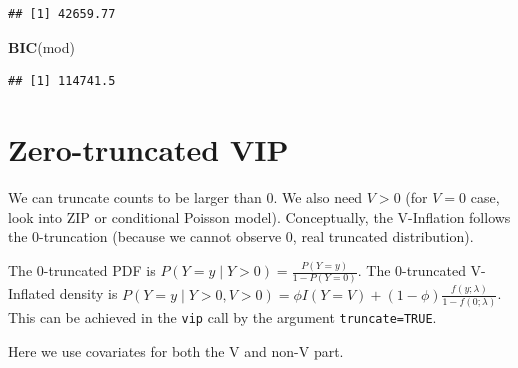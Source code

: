 \documentclass[]{article}
\newenvironment{Shaded}{\begin{snugshade}}{\end{snugshade}}
\newcommand{\KeywordTok}[1]{\textcolor[rgb]{0.13,0.29,0.53}{\textbf{#1}}}
\newcommand{\NormalTok}[1]{#1}
\begin{document}
\begin{verbatim}
## [1] 42659.77
\end{verbatim}

\begin{Shaded}
\begin{Highlighting}[]
\KeywordTok{BIC}\NormalTok{(mod)}
\end{Highlighting}
\end{Shaded}

\begin{verbatim}
## [1] 114741.5
\end{verbatim}

\section{Zero-truncated VIP}\label{zero-truncated-vip}

We can truncate counts to be larger than 0. We also need \(V>0\) (for
\(V=0\) case, look into ZIP or conditional Poisson model). Conceptually,
the V-Inflation follows the 0-truncation (because we cannot observe 0,
real truncated distribution).

The 0-truncated PDF is \(P(Y=y \mid Y>0) = \frac{P(Y=y)}{1 - P(Y=0)}\).
The 0-truncated V-Inflated density is
\(P(Y=y \mid Y>0,V>0) = \phi I(Y=V) + (1-\phi) \frac{f(y; \lambda)}{1-f(0; \lambda)}\).
This can be achieved in the \texttt{vip} call by the argument
\texttt{truncate=TRUE}.

Here we use covariates for both the V and non-V part.
\end{document}
